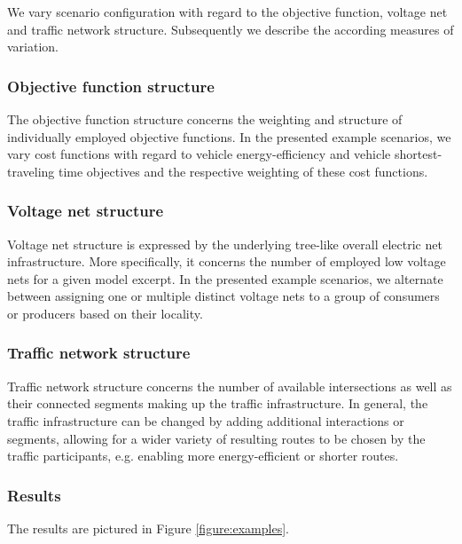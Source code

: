 We vary scenario configuration with regard to the objective function, voltage net and traffic network structure. Subsequently we describe the according measures of variation.

\subsubsection{Objective function structure}

The objective function structure concerns the weighting and structure of individually employed objective functions. In the presented example scenarios, we vary cost functions with regard to vehicle energy-efficiency and vehicle shortest-traveling time objectives and the respective weighting of these cost functions. 

\subsubsection{Voltage net structure}
Voltage net structure is expressed by the underlying tree-like overall electric net infrastructure. More specifically, it concerns the number of employed low voltage nets for a given model excerpt. In the presented example scenarios, we alternate between assigning one or multiple distinct voltage nets to a group of consumers or producers based on their locality.

\subsubsection{Traffic network structure}
Traffic network structure concerns the number of available intersections as well as their connected segments making up the traffic infrastructure. In general, the traffic infrastructure can be changed by adding additional interactions or segments, allowing for a wider variety of resulting routes to be chosen by the traffic participants, e.g. enabling more energy-efficient or shorter routes.

\subsubsection{Results}
The results are pictured in Figure \ref{figure:examples}. 

